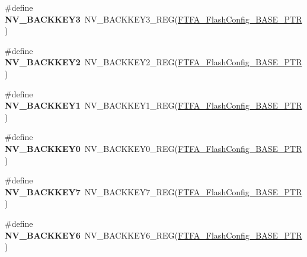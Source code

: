 \begin{DoxyCompactItemize}
\item 
\mbox{\label{group___n_v___register___accessor___macros_ga18932af5b184d02998db112b364e45e1}} 
\#define {\bfseries N\+V\+\_\+\+B\+A\+C\+K\+K\+E\+Y3}~N\+V\+\_\+\+B\+A\+C\+K\+K\+E\+Y3\+\_\+\+R\+EG(\hyperlink{group___n_v___peripheral_ga3458652dfc38239f92682556e63596b5}{F\+T\+F\+A\+\_\+\+Flash\+Config\+\_\+\+B\+A\+S\+E\+\_\+\+P\+TR})
\item 
\mbox{\label{group___n_v___register___accessor___macros_ga51642a3d84acba43ff0aa3925226ab32}} 
\#define {\bfseries N\+V\+\_\+\+B\+A\+C\+K\+K\+E\+Y2}~N\+V\+\_\+\+B\+A\+C\+K\+K\+E\+Y2\+\_\+\+R\+EG(\hyperlink{group___n_v___peripheral_ga3458652dfc38239f92682556e63596b5}{F\+T\+F\+A\+\_\+\+Flash\+Config\+\_\+\+B\+A\+S\+E\+\_\+\+P\+TR})
\item 
\mbox{\label{group___n_v___register___accessor___macros_gae849f8e6eaa76305b07c567463074dc9}} 
\#define {\bfseries N\+V\+\_\+\+B\+A\+C\+K\+K\+E\+Y1}~N\+V\+\_\+\+B\+A\+C\+K\+K\+E\+Y1\+\_\+\+R\+EG(\hyperlink{group___n_v___peripheral_ga3458652dfc38239f92682556e63596b5}{F\+T\+F\+A\+\_\+\+Flash\+Config\+\_\+\+B\+A\+S\+E\+\_\+\+P\+TR})
\item 
\mbox{\label{group___n_v___register___accessor___macros_gadb8e2eb4db4de2a485b31c2a1dd393af}} 
\#define {\bfseries N\+V\+\_\+\+B\+A\+C\+K\+K\+E\+Y0}~N\+V\+\_\+\+B\+A\+C\+K\+K\+E\+Y0\+\_\+\+R\+EG(\hyperlink{group___n_v___peripheral_ga3458652dfc38239f92682556e63596b5}{F\+T\+F\+A\+\_\+\+Flash\+Config\+\_\+\+B\+A\+S\+E\+\_\+\+P\+TR})
\item 
\mbox{\label{group___n_v___register___accessor___macros_gaf4c4eb8173a514a0fe632f29e80423d4}} 
\#define {\bfseries N\+V\+\_\+\+B\+A\+C\+K\+K\+E\+Y7}~N\+V\+\_\+\+B\+A\+C\+K\+K\+E\+Y7\+\_\+\+R\+EG(\hyperlink{group___n_v___peripheral_ga3458652dfc38239f92682556e63596b5}{F\+T\+F\+A\+\_\+\+Flash\+Config\+\_\+\+B\+A\+S\+E\+\_\+\+P\+TR})
\item 
\mbox{\label{group___n_v___register___accessor___macros_ga74544d83ca29fc4d859726eb023dadb9}} 
\#define {\bfseries N\+V\+\_\+\+B\+A\+C\+K\+K\+E\+Y6}~N\+V\+\_\+\+B\+A\+C\+K\+K\+E\+Y6\+\_\+\+R\+EG(\hyperlink{group___n_v___peripheral_ga3458652dfc38239f92682556e63596b5}{F\+T\+F\+A\+\_\+\+Flash\+Config\+\_\+\+B\+A\+S\+E\+\_\+\+P\+TR})

\end{DoxyCompactItemize}
